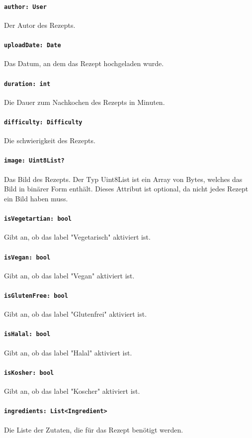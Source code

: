 \documentclass{entwurfsheft}
\begin{document}
\paragraph{\texttt{author: User}}
Der Autor des Rezepts.
\paragraph{\texttt{uploadDate: Date}}
Das Datum, an dem das Rezept hochgeladen wurde.
\paragraph{\texttt{duration: int}}
Die Dauer zum Nachkochen des Rezepts in Minuten.
\paragraph{\texttt{difficulty: Difficulty}}
Die \Gls{schwierigkeit} des Rezepts.
\paragraph{\texttt{image: Uint8List?}}
Das Bild des Rezepts. Der Typ Uint8List ist ein Array von Bytes, welches das Bild in binärer Form enthält. Dieses Attribut ist optional, da nicht jedes Rezept ein Bild haben muss.
\paragraph{\texttt{isVegetartian: bool}}
Gibt an, ob das \Gls{label} "Vegetarisch" aktiviert ist.
\paragraph{\texttt{isVegan: bool}}
Gibt an, ob das \Gls{label} "Vegan" aktiviert ist.
\paragraph{\texttt{isGlutenFree: bool}}
Gibt an, ob das \Gls{label} "Glutenfrei" aktiviert ist.
\paragraph{\texttt{isHalal: bool}}
Gibt an, ob das \Gls{label} "Halal" aktiviert ist.
\paragraph{\texttt{isKosher: bool}}
Gibt an, ob das \Gls{label} "Koscher" aktiviert ist.
\paragraph{\texttt{ingredients: List<Ingredient>}}
Die Liste der Zutaten, die für das Rezept benötigt werden.
\end{document}

